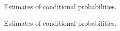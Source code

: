 \begin{figure}
  \caption{Estimates of conditional probabilities.}
  \label{con_agf_bord}
\end{figure}

\begin{figure}
  \caption{Estimates of conditional probabilities.}
  \label{con_svm}
\end{figure}

